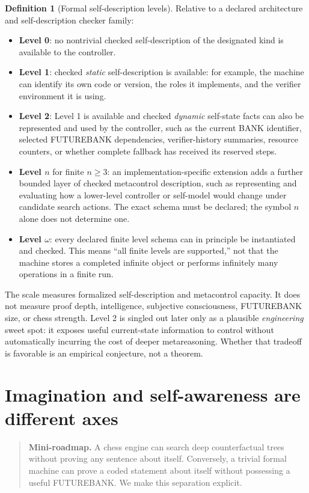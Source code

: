 \documentclass[11pt,openany]{book}
\theoremstyle{definition}
\newtheorem{definition}[theorem]{Definition}
\theoremstyle{remark}
\newenvironment{miniroadmap}{\begin{quote}\small\color{deepblue}\textbf{Mini-roadmap.} }{\end{quote}}
\begin{document}
\begin{definition}[Formal self-description levels]
Relative to a declared architecture and self-description checker family:
\begin{itemize}
\item \textbf{Level 0}: no nontrivial checked self-description of the designated kind is available to the controller.
\item \textbf{Level 1}: checked \emph{static} self-description is available: for example, the machine can identify its own code or version, the roles it implements, and the verifier environment it is using.
\item \textbf{Level 2}: Level 1 is available and checked \emph{dynamic} self-state facts can also be represented and used by the controller, such as the current BANK identifier, selected FUTUREBANK dependencies, verifier-history summaries, resource counters, or whether complete fallback has received its reserved steps.
\item \textbf{Level $n$} for finite $n\ge3$: an implementation-specific extension adds a further bounded layer of checked metacontrol description, such as representing and evaluating how a lower-level controller or self-model would change under candidate search actions. The exact schema must be declared; the symbol $n$ alone does not determine one.
\item \textbf{Level $\omega$}: every declared finite level schema can in principle be instantiated and checked. This means ``all finite levels are supported,'' not that the machine stores a completed infinite object or performs infinitely many operations in a finite run.
\end{itemize}
\end{definition}

The scale measures formalized self-description and metacontrol capacity. It does not measure proof depth, intelligence, subjective consciousness, FUTUREBANK size, or chess strength. Level 2 is singled out later only as a plausible \emph{engineering} sweet spot: it exposes useful current-state information to control without automatically incurring the cost of deeper metareasoning. Whether that tradeoff is favorable is an empirical conjecture, not a theorem.

\chapter{Imagination and self-awareness are different axes}
\begin{miniroadmap}
A chess engine can search deep counterfactual trees without proving any sentence about itself. Conversely, a trivial formal machine can prove a coded statement about itself without possessing a useful FUTUREBANK. We make this separation explicit.
\end{miniroadmap}
\end{document}
